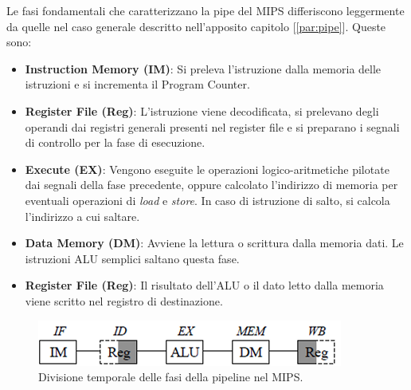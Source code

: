 Le fasi fondamentali che caratterizzano la pipe del MIPS differiscono leggermente da quelle nel caso generale descritto nell'apposito capitolo [\ref{par:pipe}]. Queste sono:
\begin{itemize}
    \item \textbf{Instruction Memory (IM)}: Si preleva l'istruzione dalla memoria delle istruzioni e si incrementa il Program Counter.
    \item \textbf{Register File (Reg)}: L'istruzione viene decodificata, si prelevano degli operandi dai registri generali presenti nel register file e si preparano i segnali di controllo per la fase di esecuzione.
    \item \textbf{Execute (EX)}: Vengono eseguite le operazioni logico-aritmetiche pilotate dai segnali della fase precedente, oppure calcolato l'indirizzo di memoria per eventuali operazioni di \textit{load} e \textit{store}. In caso di istruzione di salto, si calcola l'indirizzo a cui saltare.
    \item \textbf{Data Memory (DM)}: Avviene la lettura o scrittura dalla memoria dati. Le istruzioni ALU semplici saltano questa fase.
    \item \textbf{Register File (Reg)}: Il risultato dell’ALU o il dato letto dalla memoria viene scritto nel registro di destinazione.
\end{itemize}
\begin{figure}[!h]
    \centering
    \includegraphics[width=0.5\linewidth]{img/MIPS_clock_split.png}
    \caption{Divisione temporale delle fasi della pipeline nel MIPS.}
    \label{fig:mips-pipe}
\end{figure}


